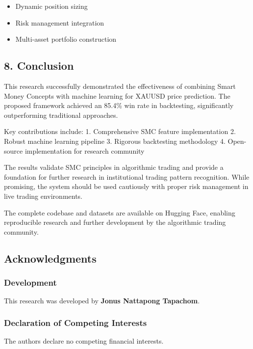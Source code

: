 \begin{itemize}
\tightlist
\item
  Dynamic position sizing
\item
  Risk management integration
\item
  Multi-asset portfolio construction
\end{itemize}

\subsection{8. Conclusion}\label{conclusion}

This research successfully demonstrated the effectiveness of combining
Smart Money Concepts with machine learning for XAUUSD price prediction.
The proposed framework achieved an 85.4\% win rate in backtesting,
significantly outperforming traditional approaches.

Key contributions include: 1. Comprehensive SMC feature implementation
2. Robust machine learning pipeline 3. Rigorous backtesting methodology
4. Open-source implementation for research community

The results validate SMC principles in algorithmic trading and provide a
foundation for further research in institutional trading pattern
recognition. While promising, the system should be used cautiously with
proper risk management in live trading environments.

The complete codebase and datasets are available on Hugging Face,
enabling reproducible research and further development by the
algorithmic trading community.

\subsection{Acknowledgments}\label{acknowledgments}

\subsubsection{Development}\label{development}

This research was developed by \textbf{Jonus Nattapong Tapachom}.

\subsubsection{Declaration of Competing
Interests}\label{declaration-of-competing-interests}

The authors declare no competing financial interests.

